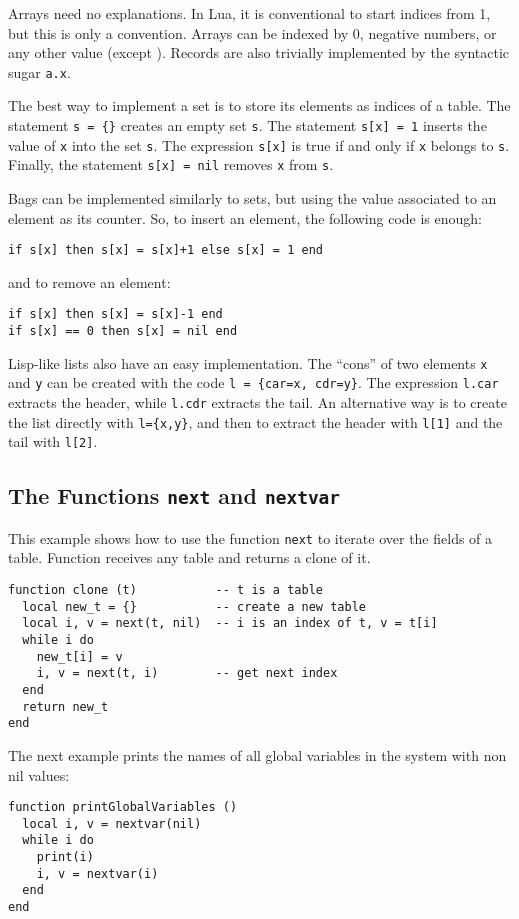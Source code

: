 Arrays need no explanations.
In Lua, it is conventional to start indices from 1,
but this is only a convention.
Arrays can be indexed by 0, negative numbers, or any other value (except \nil).
Records are also trivially implemented by the syntactic sugar
\verb'a.x'.

The best way to implement a set is to store
its elements as indices of a table.
The statement \verb's = {}' creates an empty set \verb's'. 
The statement \verb's[x] = 1' inserts the value of \verb'x' into
the set \verb's'.
The expression \verb's[x]' is true if and only if
\verb'x' belongs to \verb's'.
Finally, the statement \verb's[x] = nil' removes \verb'x' from \verb's'.

Bags can be implemented similarly to sets,
but using the value associated to an element as its counter.
So, to insert an element, 
the following code is enough:
\begin{verbatim}
if s[x] then s[x] = s[x]+1 else s[x] = 1 end
\end{verbatim}
and to remove an element:
\begin{verbatim}
if s[x] then s[x] = s[x]-1 end
if s[x] == 0 then s[x] = nil end
\end{verbatim}

Lisp-like lists also have an easy implementation.
The ``cons'' of two elements \verb'x' and \verb'y' can be
created with the code \verb'l = {car=x, cdr=y}'.
The expression \verb'l.car' extracts the header, 
while \verb'l.cdr' extracts the tail.
An alternative way is to create the list directly with \verb'l={x,y}',
and then to extract the header with \verb'l[1]' and
the tail with \verb'l[2]'.

\subsection{The Functions {\tt next} and {\tt nextvar}} \label{exnext}
This example shows how to use the function \verb'next' to iterate
over the fields of a table.
Function  receives any table and returns a clone of it.
\begin{verbatim}
function clone (t)           -- t is a table
  local new_t = {}           -- create a new table
  local i, v = next(t, nil)  -- i is an index of t, v = t[i]
  while i do
    new_t[i] = v
    i, v = next(t, i)        -- get next index
  end
  return new_t
end
\end{verbatim}

The next example prints the names of all global variables
in the system with non nil values:
\begin{verbatim}
function printGlobalVariables ()
  local i, v = nextvar(nil)
  while i do
    print(i)
    i, v = nextvar(i)
  end
end
\end{verbatim}


